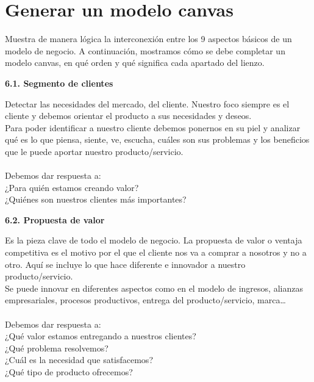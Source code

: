 \section{Generar un modelo canvas}
\item{Muestra de manera lógica la interconexión entre los 9 aspectos básicos de un modelo de negocio. A continuación, mostramos cómo se debe completar un modelo canvas, en qué orden y qué significa cada apartado del lienzo.}
\\
\item \textbf{6.1. Segmento de clientes}
\item{Detectar las necesidades del mercado, del cliente. Nuestro foco siempre es el cliente y debemos orientar el producto a sus necesidades y deseos.\\
Para poder identificar a nuestro cliente debemos ponernos en su piel y analizar qué es lo que piensa, siente, ve, escucha, cuáles son sus problemas y los beneficios que le puede aportar nuestro producto/servicio.\\\\
Debemos dar respuesta a:\\
¿Para quién estamos creando valor?\\
¿Quiénes son nuestros clientes más importantes?}
\\
\item \textbf{6.2. Propuesta de valor}
\item Es la pieza clave de todo el modelo de negocio. La propuesta de valor o ventaja competitiva es el motivo por el que el cliente nos va a comprar a nosotros y no a otro. Aquí se incluye lo que hace diferente e innovador a nuestro producto/servicio.\\
Se puede innovar en diferentes aspectos como en el modelo de ingresos, alianzas empresariales, procesos productivos, entrega del producto/servicio, marca…\\\\
Debemos dar respuesta a:\\
¿Qué valor estamos entregando a nuestros clientes?\\
¿Qué problema resolvemos?\\
¿Cuál es la necesidad que satisfacemos?\\
¿Qué tipo de producto ofrecemos?
\\

